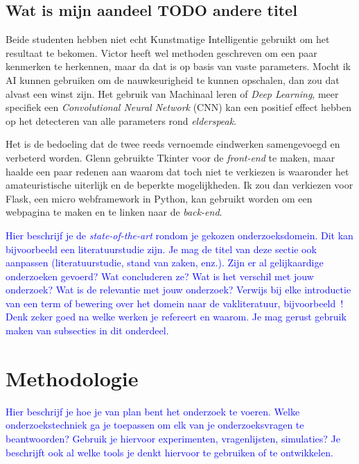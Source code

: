 \subsection{Wat is mijn aandeel TODO andere titel}

Beide studenten hebben niet echt Kunstmatige Intelligentie gebruikt om het resultaat te bekomen. Victor heeft wel methoden geschreven om een paar kenmerken te herkennen, maar da dat is op basis van vaste parameters.
Mocht ik AI kunnen gebruiken om de nauwkeurigheid te kunnen opschalen, dan zou dat alvast een winst zijn. Het gebruik van Machinaal leren of \textit{Deep Learning}, meer specifiek een \textit{Convolutional Neural Network} (CNN) kan een positief effect hebben op het detecteren van alle parameters rond \textit{elderspeak}.

Het is de bedoeling dat de twee reeds vernoemde eindwerken samengevoegd en verbeterd worden. Glenn gebruikte Tkinter voor de \textit{front-end} te maken, maar haalde een paar redenen aan waarom dat toch niet te verkiezen is waaronder het amateuristische uiterlijk en de beperkte mogelijkheden. Ik zou dan verkiezen voor Flask, een micro webframework in Python, kan gebruikt worden om een webpagina te maken en te linken naar de \textit{back-end}.

\textcolor{blue}{
Hier beschrijf je de \emph{state-of-the-art} rondom je gekozen onderzoeksdomein. Dit kan bijvoorbeeld een literatuurstudie zijn. Je mag de titel van deze sectie ook aanpassen (literatuurstudie, stand van zaken, enz.). Zijn er al gelijkaardige onderzoeken gevoerd? Wat concluderen ze? Wat is het verschil met jouw onderzoek? Wat is de relevantie met jouw onderzoek?
Verwijs bij elke introductie van een term of bewering over het domein naar de vakliteratuur, bijvoorbeeld~\autocite{Doll1954}! Denk zeker goed na welke werken je refereert en waarom.
Je mag gerust gebruik maken van subsecties in dit onderdeel.}

\section{Methodologie}
\label{sec:methodologie}

\textcolor{blue}{Hier beschrijf je hoe je van plan bent het onderzoek te voeren. Welke onderzoekstechniek ga je toepassen om elk van je onderzoeksvragen te beantwoorden? Gebruik je hiervoor experimenten, vragenlijsten, simulaties? Je beschrijft ook al welke tools je denkt hiervoor te gebruiken of te ontwikkelen.}

